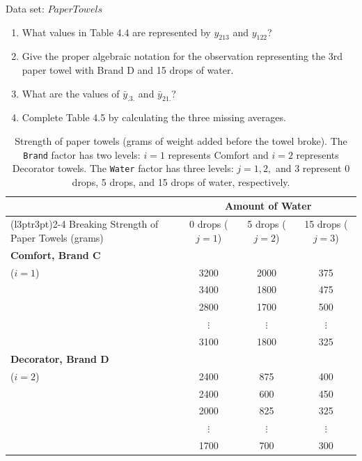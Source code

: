 \documentclass[
]{report}
\providecommand{\tightlist}{%
  \setlength{\itemsep}{0pt}\setlength{\parskip}{0pt}}
\begin{document}
Data set: \(PaperTowels\)

\begin{enumerate}
\def\labelenumi{\arabic{enumi}.}
\setcounter{enumi}{19}
\tightlist
\item
  What values in Table 4.4 are represented by \(y_{213}\) and \(y_{122}\)?
\item
  Give the proper algebraic notation for the observation representing the 3rd paper towel with Brand D
  and 15 drops of water.
\item
  What are the values of \(\bar{y}_{.3.}\) and \(\bar{y}_{21.}\)?
\item
  Complete Table 4.5 by calculating the three missing averages.
\end{enumerate}

\begin{table}[!h]
\centering
\caption{\label{tab:tab44}Strength of paper towels (grams of weight added before the towel broke). The \texttt{Brand} factor has two levels: $i = 1$ represents Comfort and $i = 2$ represents Decorator towels. The \texttt{Water} factor has three levels: $j = 1, 2,$ and 3 represent 0 drops, 5 drops, and 15 drops of water, respectively.}
\centering
\begin{tabular}[t]{>{\raggedright\arraybackslash}p{3.5cm}ccc}
\toprule
\multicolumn{1}{c}{ } & \multicolumn{3}{c}{Amount of Water} \\
\cmidrule(l{3pt}r{3pt}){2-4}
Breaking Strength of Paper Towels (grams) & 0 drops ($j=1$) & 5 drops ($j=2$) & 15 drops ($j=3$)\\
\midrule
\textbf{Comfort, Brand C} \\ ($i = 1$) & 3200 & 2000 & 375\\
 & 3400 & 1800 & 475\\
 & 2800 & 1700 & 500\\
 & $\vdots$ & $\vdots$ & \vphantom{1} $\vdots$\\
 & 3100 & 1800 & 325\\
\addlinespace
\textbf{Decorator, Brand D} \\ ($i = 2$) & 2400 & 875 & 400\\
 & 2400 & 600 & 450\\
 & 2000 & 825 & 325\\
 & $\vdots$ & $\vdots$ & $\vdots$\\
 & 1700 & 700 & 300\\
\bottomrule
\end{tabular}
\end{table}
\end{document}
